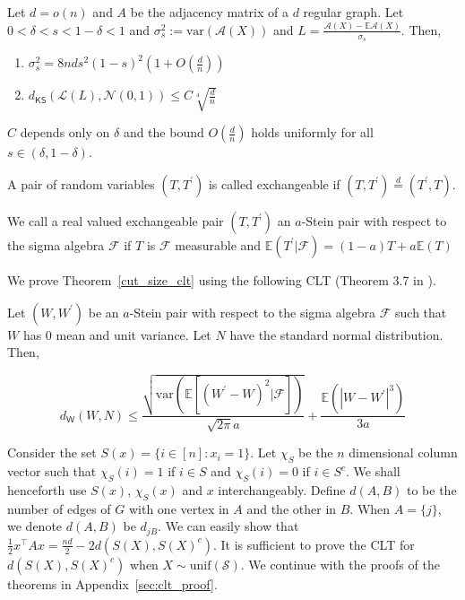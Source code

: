 \documentclass[final,12pt]{colt2018}
\begin{document}
\begin{theorem}
\label{cut_size_clt}
Let $d = o(n)$ and $A$ be the adjacency matrix of a $d$ regular graph. Let $0<\delta<s<1-\delta<1$ and $\sigma^2_s := \mathrm{var}(\mathcal{A}(X)) $ and $L = \frac{\mathcal{A}(X)-\mathbb{E}\mathcal{A}(X)}{\sigma_s}$. Then,
\begin{enumerate}
\item
 $\sigma_s^2 = 8nds^2(1-s)^2(1+ O(\frac{d}{n}))$ 
 \item
 $d_{\mathsf{KS}}(\mathcal{L}(L),\mathcal{N}(0,1)) \leq C\sqrt[4]{\frac{d}{n}}$
\end{enumerate}
$C$ depends only on $\delta$ and the bound $O\left(\frac{d}{n}\right)$ holds uniformly for all $s \in (\delta,1-\delta)$.
\end{theorem}

A pair of random variables $(T,T^{\prime})$ is called exchangeable if $(T,T^{\prime}) \stackrel{d}{=} (T^{\prime},T)$.
\begin{definition}
We call a real valued exchangeable pair $(T,T^{\prime})$ an $a$-Stein pair with respect to the sigma algebra $\mathcal{F}$ if $T$ is $\mathcal{F}$ measurable and
$\mathbb{E}(T^{\prime}|\mathcal{F}) = (1-a)T + a\mathbb{E}(T)$
\end{definition}


We prove Theorem~\ref{cut_size_clt} using the following CLT (Theorem 3.7 in \citet{ross2011fundamentals}).
\begin{theorem}
\label{stein_clt}
Let $(W,W^{\prime})$ be an $a$-Stein pair with respect to the sigma algebra $\mathcal{F}$ such that $W$ has 0 mean and unit variance. Let $N$ have the standard normal distribution. Then, 

$$d_{\mathsf{W}}(W,N) \leq \frac{\sqrt{\mathrm{var}\left(\mathbb{E}\left[(W^{\prime}-W)^2|\mathcal{F}\right]\right)}}{\sqrt{2\pi} a} + \frac{\mathbb{E}\left(|W-W^{\prime}|^3\right)}{3a}$$
\end{theorem}

 Consider the set $S(x) = \{i \in [n] : x_i = 1\}$. Let $\chi_S$ be the $n$ dimensional column vector such that $\chi_S(i) = 1$ if $i\in S$ and $\chi_S(i) = 0$ if $i \in S^{c}$. We shall henceforth use $S(x)$, $\chi_S(x)$ and $x$ interchangeably. Define $d(A,B)$ to be the number of edges of $G$ with one vertex in $A$ and the other in $B$. When $A= \{j\}$, we denote $d(A,B)$ be $d_{jB}$. We can easily show that 
$\frac{1}{2} x^{\intercal}Ax = \frac{nd}{2} - 2d(S(X),S(X)^c)
\label{eq:cut_size_identity}
$.
 It is sufficient to prove the CLT for $d(S(X),S(X)^c)$ when $X \sim \mathrm{unif}(\mathcal{S})$. We continue with the proofs of the theorems in Appendix~\ref{sec:clt_proof}.
\end{document}
